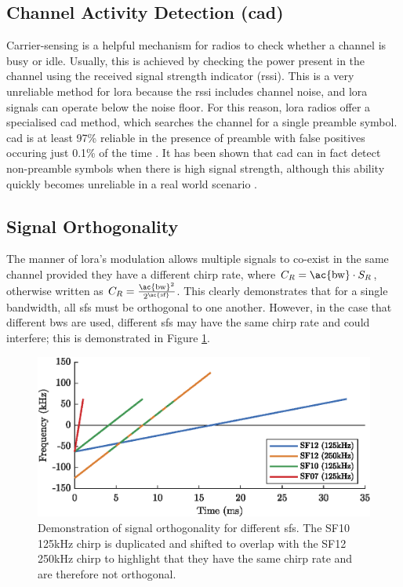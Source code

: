 \subsection{Channel Activity Detection (\ac{cad})}\label{sec:cad}
Carrier-sensing is a helpful mechanism for radios to check whether a channel is busy or idle. Usually, this is achieved by checking the power present in the channel using the received signal strength indicator (\ac{rssi}). This is a very unreliable method for \ac{lora} because the \ac{rssi} includes channel noise, and \ac{lora} signals can operate below the noise floor. For this reason, \ac{lora} radios offer a specialised \ac{cad} method, which searches the channel for a single preamble symbol. \ac{cad} is at least 97\% reliable in the presence of preamble with false positives occuring just 0.1\% of the time \cite{3YP:LORA_FOR_IOT}. It has been shown that \ac{cad} can in fact detect non-preamble symbols when there is high signal strength, although this ability quickly becomes unreliable in a real world scenario \cite{3YP:LORA_CSMA}.

\subsection{Signal Orthogonality}\label{sec:sf_orthogonality}
The manner of \ac{lora}'s modulation allows multiple signals to co-exist in the same channel provided they have a different chirp rate, where $C_R = \text{\ac{bw}} \cdot S_R$, otherwise written as $C_R = \frac{\text{\ac{bw}}^2}{2^{\text{\ac{sf}}}}$. This clearly demonstrates that for a single bandwidth, all \ac{sf}s must be orthogonal to one another. However, in the case that different \ac{bw}s are used, different \ac{sf}s may have the same chirp rate and could interfere; this is demonstrated in Figure \ref{fig:orthogonality}.

\begin{figure}[H]
    \centering
   	\includegraphics{Figures/sf_orthogonality_plot}
    \caption[Signal chirp rate orthogonality]{
    Demonstration of signal orthogonality for different \ac{sf}s. The SF10 125kHz chirp is duplicated and shifted to overlap with the  SF12 250kHz chirp to highlight that they have the same chirp rate and are therefore not orthogonal.
    }
    \label{fig:orthogonality}
\end{figure}

